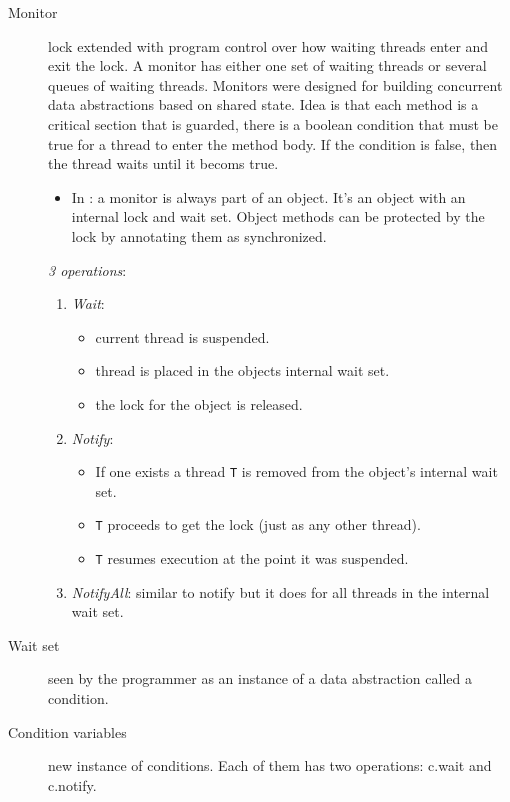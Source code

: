 \begin{description}
  \item[Monitor] lock extended with program control over how waiting threads enter and exit the lock.
    A monitor has either one set of waiting threads or several queues of waiting threads.
    Monitors were designed for building concurrent data abstractions based on shared state.
    Idea is that each method is a critical section that is guarded, there is a boolean condition that must be true for a thread to enter the method body.
    If the condition is false, then the thread waits until it becoms true.
    \begin{itemize}
      \item In \java{}: a monitor is always part of an object.
        It's an object with an internal lock and wait set.
        Object methods can be protected by the lock by annotating them as synchronized.
    \end{itemize}

    \emph{3 operations}:
    \begin{enumerate}
      \item \emph{Wait}:
        \begin{itemize}
          \item current thread is suspended.
          \item thread is placed in the objects internal wait set.
          \item the lock for the object is released.
        \end{itemize}
      \item \emph{Notify}:
        \begin{itemize}
          \item If one exists a thread \lstinline|T| is removed from the object's internal wait set.
          \item \lstinline|T| proceeds to get the lock (just as any other thread).
          \item \lstinline|T| resumes execution at the point it was suspended.
        \end{itemize}
      \item \emph{NotifyAll}: similar to notify but it does for all threads in the internal wait set.
    \end{enumerate}

  \item[Wait set] seen by the programmer as an instance of a data abstraction called a condition.
  \item[Condition variables] new instance of conditions.
    Each of them has two operations: c.wait and c.notify.
\end{description}

